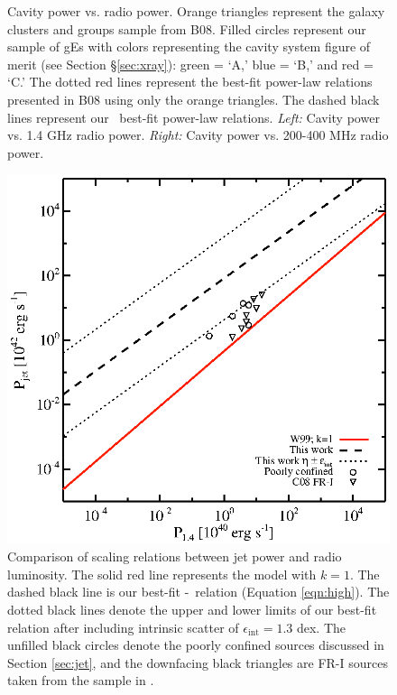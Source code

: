 \begin{center}
\begin{figure}[htp]
\begin{minipage}[htp]{0.5\linewidth}
    \end{minipage}
    \caption{Cavity power vs. radio power. Orange triangles represent
      the galaxy clusters and groups sample from B08. Filled circles
      represent our sample of gEs with colors representing the cavity
      system figure of merit (see Section \S\ref{sec:xray}): green =
      `A,' blue = `B,' and red = `C.' The dotted red lines represent
      the best-fit power-law relations presented in B08 using only the
      orange triangles. The dashed black lines represent our
      \bces\ best-fit power-law relations. {\it{Left:}} Cavity power
      vs. 1.4 GHz radio power. {\it{Right:}} Cavity power vs. 200-400
      MHz radio power.}
    \label{fig:pcav}
  \end{figure}
\end{center}

\begin{figure}[htp]
  \begin{center}
    \begin{minipage}[htp]{0.5\linewidth}
      \includegraphics*[width=\textwidth, trim=30mm 5mm 40mm 15mm, clip]{f2.eps}
      \caption{Comparison of scaling relations between jet power and
        radio luminosity. The solid red line represents the
        \citet[][W99]{w99} model with $k=1$. The dashed black line is
        our best-fit \pjet-\phigh\ relation (Equation
        \ref{eqn:high}). The dotted black lines denote the upper and
        lower limits of our best-fit relation after including
        intrinsic scatter of $\epsilon_{\mathrm{int}} = 1.3$ dex. The
        unfilled black circles denote the poorly confined sources
        discussed in Section \ref{sec:jet}, and the downfacing black
        triangles are FR-I sources taken from the sample in
        \citet[][C08]{2008MNRAS.386.1709C}.}
      \label{fig:radeff}
    \end{minipage}
  \end{center}
\end{figure}

